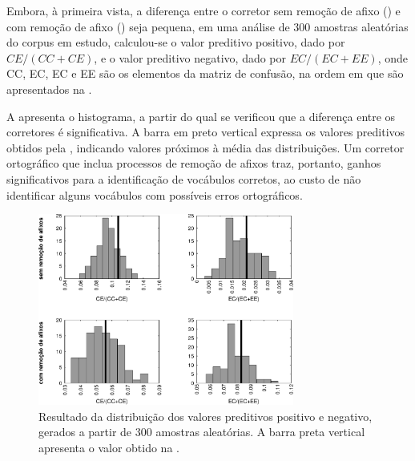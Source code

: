 \documentclass{textolivre}
\begin{document}
Embora, à primeira vista, a diferença entre o corretor sem remoção de afixo () e
com remoção de afixo () seja pequena, em uma análise de
300 amostras aleatórias do corpus em estudo, calculou-se o valor preditivo positivo, dado por $CE/(CC+CE)$,
e o valor preditivo negativo, dado por  $EC/(EC+EE)$,
onde CC, EC, EC e EE são os elementos da matriz de confusão, na ordem em que são apresentados na .

A  apresenta o histograma,
a partir do qual se verificou que a diferença entre os corretores é significativa.
A barra em preto vertical expressa os valores preditivos 
obtidos pela , indicando valores
próximos à média das distribuições. 
Um corretor ortográfico que inclua processos de remoção de afixos traz,
portanto, ganhos significativos para
a identificação de vocábulos corretos,
ao custo de não identificar alguns vocábulos 
com possíveis erros ortográficos.



\begin{figure}[h]
\centering
\includegraphics[width=0.75\textwidth]{hist_confmtx.pdf}
\caption{Resultado da distribuição dos valores preditivos positivo e negativo, gerados a partir de 300 amostras aleatórias. A barra preta vertical apresenta o valor obtido na .}
\label{fig-idx-300-tst}
\end{figure}
\end{document}
